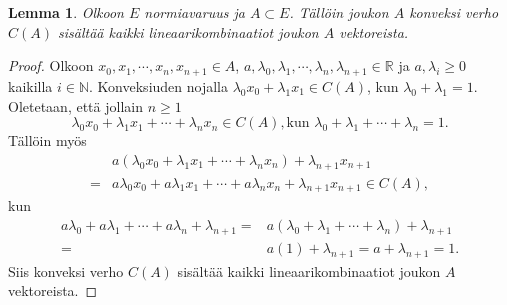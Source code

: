 \documentclass[12pt,a4paper,leqno]{report}
\newcommand{\R}{\mathbb{R}}
\newcommand{\N}{\mathbb{N}}
\theoremstyle{plain}
\newtheorem{lem}[equation]{Lemma}
\theoremstyle{definition}
\theoremstyle{remark}
\begin{document}
\begin{lem} \emph{Olkoon $E$ normiavaruus ja $A\subset E$. Tällöin joukon $A$ konveksi verho $C(A)$ sisältää kaikki lineaarikombinaatiot joukon $A$ vektoreista. }
\end{lem}

\begin{proof}
Olkoon $x_0,x_1,\cdots, x_n, x_{n+1} \in A$, $a,\lambda_0,\lambda_1,\cdots, \lambda_n, \lambda_{n+1} \in \R$ ja $a,\lambda_i\geq 0$ kaikilla $ i\in\N$. Konveksiuden nojalla 
$\lambda_0 x_0+\lambda_1 x_1 \in C(A)$, kun $\lambda_0 +\lambda_1=1$.
Oletetaan, että jollain $n\geq 1$ 
\begin{equation*}
\lambda_0 x_0+\lambda_1 x_1+\cdots+\lambda_{n} x_{n}\in C(A), \text{kun } \lambda_0+\lambda_1+\cdots+ \lambda_{n} =1.
 \end{equation*}
Tällöin myös
\begin{equation*}
\begin{split}
&a(\lambda_0 x_0+\lambda_1 x_1+\cdots+\lambda_{n}x_n)+\lambda_{n+1} x_{n+1}\\=&a\lambda_0 x_0+a\lambda_1 x_1+\cdots+a\lambda_{n}x_n+\lambda_{n+1} x_{n+1}
\in C(A),
\end{split}
\end{equation*}
kun 
\begin{equation*}
\begin{split}
a\lambda_0+a\lambda_1+\cdots+ a\lambda_{n}+ \lambda_{n+1}=&a(\lambda_0+\lambda_1+\cdots+ \lambda_{n})+ \lambda_{n+1}\\=&a(1)+ \lambda_{n+1}=a+ \lambda_{n+1}=1.
\end{split}
\end{equation*} 
Siis konveksi verho $C(A)$ sisältää kaikki lineaarikombinaatiot joukon $A$ vektoreista.



\end{proof}
\end{document}

